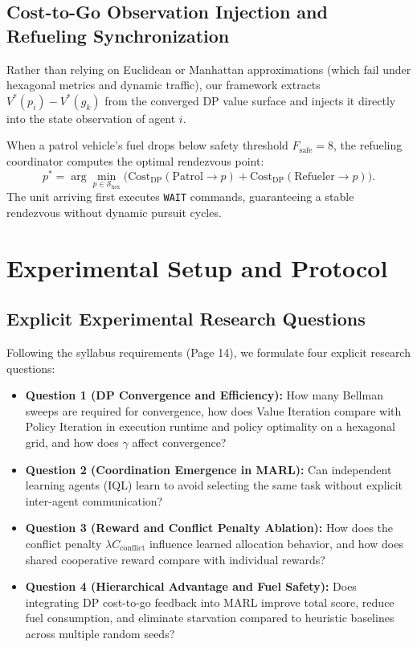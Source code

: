 \documentclass[11pt,a4paper]{article}
\begin{document}
\subsection{Cost-to-Go Observation Injection and Refueling Synchronization}
Rather than relying on Euclidean or Manhattan approximations (which fail under hexagonal metrics and dynamic traffic), our framework extracts $V^*(p_i) - V^*(g_k)$ from the converged DP value surface and injects it directly into the state observation of agent $i$. 

When a patrol vehicle's fuel drops below safety threshold $F_{\text{safe}} = 8$, the refueling coordinator computes the optimal rendezvous point:
\begin{equation}
    p^* = \arg\min_{p \in \mathcal{S}_{\text{hex}}} \Big( \text{Cost}_{\text{DP}}(\text{Patrol} \to p) + \text{Cost}_{\text{DP}}(\text{Refueler} \to p) \Big).
\end{equation}
The unit arriving first executes \texttt{WAIT} commands, guaranteeing a stable rendezvous without dynamic pursuit cycles.

\section{Experimental Setup and Protocol}

\subsection{Explicit Experimental Research Questions}
Following the syllabus requirements (Page 14), we formulate four explicit research questions:
\begin{itemize}
    \item \textbf{Question 1 (DP Convergence and Efficiency):} How many Bellman sweeps are required for convergence, how does Value Iteration compare with Policy Iteration in execution runtime and policy optimality on a hexagonal grid, and how does $\gamma$ affect convergence?
    \item \textbf{Question 2 (Coordination Emergence in MARL):} Can independent learning agents (IQL) learn to avoid selecting the same task without explicit inter-agent communication?
    \item \textbf{Question 3 (Reward and Conflict Penalty Ablation):} How does the conflict penalty $\lambda C_{\text{conflict}}$ influence learned allocation behavior, and how does shared cooperative reward compare with individual rewards?
    \item \textbf{Question 4 (Hierarchical Advantage and Fuel Safety):} Does integrating DP cost-to-go feedback into MARL improve total score, reduce fuel consumption, and eliminate starvation compared to heuristic baselines across multiple random seeds?
\end{itemize}
\end{document}
